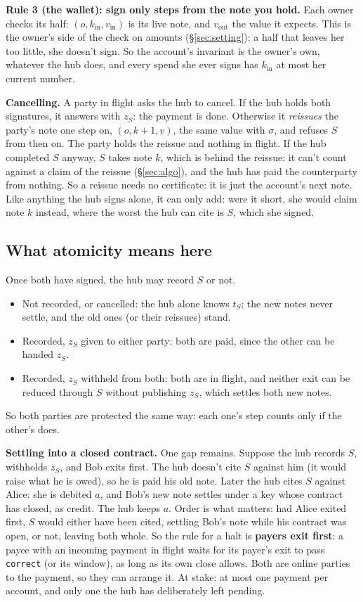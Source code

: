 \documentclass[11pt]{article}
\theoremstyle{plain}
\theoremstyle{definition}
\newcommand{\tx}[1]{\texttt{#1}}
\newcommand{\kin}{k_{\mathrm{in}}}
\newcommand{\vin}{v_{\mathrm{in}}}
\newcommand{\vout}{v_{\mathrm{out}}}
\begin{document}
\textbf{Rule 3 (the wallet): sign only steps from the note you hold.}
Each owner checks its half: $(o, \kin, \vin)$ is its live note, and
$\vout$ the value it expects. This is the owner's side of the check on
amounts (\S\ref{sec:setting}): a half that leaves her too little, she
doesn't sign. So the account's invariant is the owner's own, whatever
the hub does, and every spend she ever signs has $\kin$ at most her
current number.

\textbf{Cancelling.} A party in flight asks the hub to cancel. If the
hub holds both signatures, it answers with $z_S$: the payment is done.
Otherwise it \emph{reissues} the party's note one step on, $(o, k + 1,
v)$, the same value with $\sigma$, and refuses $S$ from then on. The
party holds the reissue and nothing in flight. If the hub completed $S$
anyway, $S$ takes note $k$, which is behind the reissue: it can't count
against a claim of the reissue (\S\ref{sec:algo}), and the hub has paid
the counterparty from nothing. So a reissue needs no certificate: it is
just the account's next note. Like anything the hub signs alone, it can
only add: were it short, she would claim note $k$ instead, where the
worst the hub can cite is $S$, which she signed.

\subsection{What atomicity means here}\label{sec:atomic}

Once both have signed, the hub may record $S$ or not.
\begin{itemize}[nosep]
\item Not recorded, or cancelled: the hub alone knows $t_S$; the new
  notes never settle, and the old ones (or their reissues) stand.
\item Recorded, $z_S$ given to either party: both are paid, since the
  other can be handed $z_S$.
\item Recorded, $z_S$ withheld from both: both are in flight, and
  neither exit can be reduced through $S$ without publishing $z_S$,
  which settles both new notes.
\end{itemize}
So both parties are protected the same way: each one's step counts only
if the other's does.

\textbf{Settling into a closed contract.} One gap remains. Suppose the
hub records $S$, withholds $z_S$, and Bob exits first. The hub doesn't
cite $S$ against him (it would raise what he is owed), so he is paid his
old note. Later the hub cites $S$ against Alice: she is debited $a$, and
Bob's new note settles under a key whose contract has closed, as credit.
The hub keeps $a$. Order is what matters: had Alice exited first, $S$
would either have been cited, settling Bob's note while his contract was
open, or not, leaving both whole. So the rule for a halt is
\textbf{payers exit first}: a payee with an incoming payment in flight
waits for its payer's exit to pass \tx{correct} (or its window), as long
as its own close allows. Both are online parties to the payment, so they
can arrange it. At stake: at most one payment per account, and only one
the hub has deliberately left pending.
\end{document}
